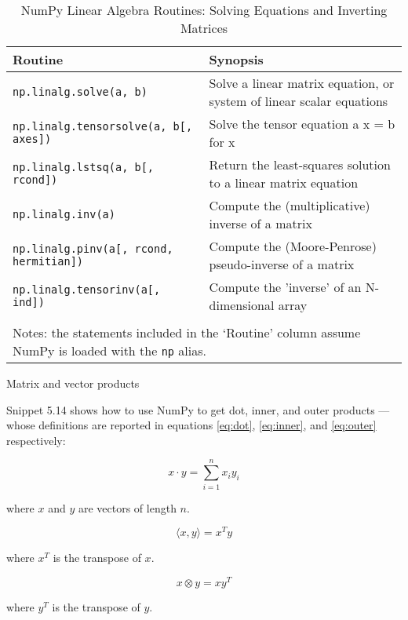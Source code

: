 \documentclass[a4paper,11pt]{book}
\numberwithin{figure}{chapter}
\numberwithin{table}{chapter}
\newcommand{\question}[1]{%
    \begin{tcolorbox}[colback=comp_c!10,colframe=comp_c,sidebyside align=top,width=\linewidth,before skip=1ex]
        #1
    \end{tcolorbox}
    \switchcolumn%
}
\newcommand{\note}[1]{%
    \begin{tcolorbox}[colback=white!0,colframe=white!10,width=\linewidth,before skip=1ex]
        #1
    \end{tcolorbox}
}
\begin{document}
\begin{sidewaystable}[!htbp]
	\centering
	\caption{NumPy Linear Algebra Routines: Solving Equations and Inverting Matrices} 
	\label{tab:solving_equations}
	\begin{tabular}{ll}
		\toprule \toprule
			Routine & Synopsis \\
			\midrule
                        \texttt{np.linalg.solve(a, b)} &
                        Solve a linear matrix equation, or system of linear scalar equations\\
                        \texttt{np.linalg.tensorsolve(a, b[, axes])} &
                        Solve the tensor equation a x = b for x\\
                        \texttt{np.linalg.lstsq(a, b[, rcond])} &
                        Return the least-squares solution to a linear matrix equation\\
                        \texttt{np.linalg.inv(a)} &
                        Compute the (multiplicative) inverse of a matrix\\
                        \texttt{np.linalg.pinv(a[, rcond, hermitian])} &
                        Compute the (Moore-Penrose) pseudo-inverse of a matrix\\
                        \texttt{np.linalg.tensorinv(a[, ind])} &
                        Compute the 'inverse' of an N-dimensional array\\
	     	\bottomrule \\[-1.8ex]
	        \multicolumn{2}{l}{Notes: the statements included in the `Routine' column assume NumPy is loaded with the \texttt{np} alias.} \\
	\end{tabular}
\end{sidewaystable}
\clearpage

\begin{paracol}{2}
    \question{\raggedright Matrix and vector products}
    \note{Snippet 5.14 shows how to use NumPy to get dot, inner, and outer products --- whose definitions are reported in equations \ref{eq:dot}, \ref{eq:inner}, and \ref{eq:outer} respectively:
    
    \begin{equation}
	\label{eq:dot}
    	x \cdot y = \sum_{i=1}^n x_{i} y_{i} 
    \end{equation}

    where $x$ and $y$ are vectors of length $n$. 

    \begin{equation}
	\label{eq:inner}
	\langle x, y\rangle = x^{T} y
    \end{equation}
    
    where $x^{T}$ is the transpose of $x$. 
    
    \begin{equation}
	\label{eq:outer}
	x \otimes y = x y^{T}
    \end{equation}

    where $y^{T}$ is the transpose of $y$.
    }
\end{paracol}
\end{document}
